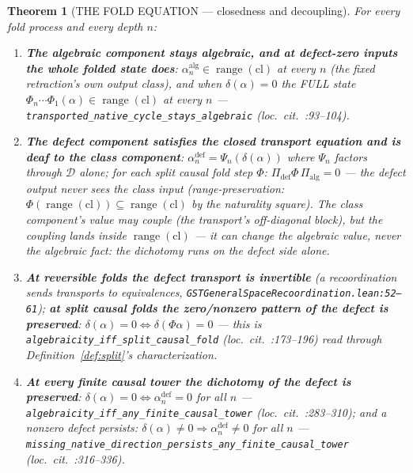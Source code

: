 \documentclass[11pt]{article}
\newtheorem{theorem}{Theorem}[section]
\begin{document}
\begin{theorem}[THE FOLD EQUATION — closedness and decoupling]
\label{thm:equation}
For every fold process and every depth $n$:
\begin{enumerate}
\item[(i)] \textbf{The algebraic component stays algebraic, and at defect-zero inputs the whole folded state does}: $\alpha^{\mathrm{alg}}_n\in\operatorname{range}(\mathrm{cl})$ at every $n$ (the fixed retraction's own output class), and when $\delta(\alpha)=0$ the FULL state $\Phi_n\cdots\Phi_1(\alpha)\in\operatorname{range}(\mathrm{cl})$ at every $n$ — \texttt{transported\_native\_cycle\_stays\_algebraic} (loc.\ cit.\ :93--104).
\item[(ii)] \textbf{The defect component satisfies the closed transport equation and is deaf to the class component}: $\alpha^{\mathrm{def}}_n=\Psi_n(\delta(\alpha))$ where $\Psi_n$ factors through $\mathcal{D}$ alone; for each split causal fold step $\Phi$: $\Pi_{\mathrm{def}}\Phi\,\Pi_{\mathrm{alg}}=0$ — the defect output \emph{never sees the class input} (range-preservation: $\Phi(\operatorname{range}(\mathrm{cl}))\subseteq\operatorname{range}(\mathrm{cl})$ by the naturality square). The class component's \emph{value} may couple (the transport's off-diagonal block), but the coupling lands \emph{inside} $\operatorname{range}(\mathrm{cl})$ — it can change the algebraic value, never the algebraic \emph{fact}: the dichotomy runs on the defect side alone.
\item[(iii)] \textbf{At reversible folds the defect transport is invertible} (a recoordination sends transports to equivalences, \texttt{GSTGeneralSpaceRecoordination.lean:52--61}); \textbf{at split causal folds the zero/nonzero pattern of the defect is preserved}: $\delta(\alpha)=0\iff\delta(\Phi\alpha)=0$ — this is \texttt{algebraicity\_iff\_split\_causal\_fold} (loc.\ cit.\ :173--196) read through Definition~\ref{def:split}'s characterization.
\item[(iv)] \textbf{At every finite causal tower the dichotomy of the defect is preserved}: $\delta(\alpha)=0\iff\alpha^{\mathrm{def}}_n=0$ for all $n$ — \texttt{algebraicity\_iff\_any\_finite\_causal\_tower} (loc.\ cit.\ :283--310); and a nonzero defect \emph{persists}: $\delta(\alpha)\ne 0\Rightarrow\alpha^{\mathrm{def}}_n\ne 0$ for all $n$ — \texttt{missing\_native\_direction\_persists\_any\_finite\_causal\_tower} (loc.\ cit.\ :316--336).
\end{enumerate}
\end{theorem}
\end{document}
